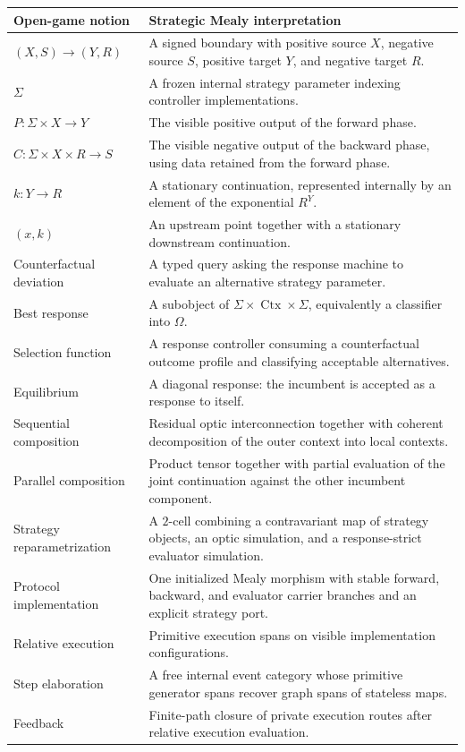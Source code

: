 \begin{center}
\begin{tabular}{p{}|p{}}
\textbf{Open-game notion}
&
\textbf{Strategic Mealy interpretation}
\\
\hline
\((X,S)\to(Y,R)\)
&
A signed boundary with positive source \(X\), negative source \(S\), positive target \(Y\), and
negative target \(R\).
\\[1mm]
\(\Sigma\)
&
A frozen internal strategy parameter indexing controller implementations.
\\[1mm]
\(P:\Sigma\times X\to Y\)
&
The visible positive output of the forward phase.
\\[1mm]
\(C:\Sigma\times X\times R\to S\)
&
The visible negative output of the backward phase, using data retained from the forward phase.
\\[1mm]
\(k:Y\to R\)
&
A stationary continuation, represented internally by an element of the exponential \(R^Y\).
\\[1mm]
\((x,k)\)
&
An upstream point together with a stationary downstream continuation.
\\[1mm]
Counterfactual deviation
&
A typed query asking the response machine to evaluate an alternative strategy parameter.
\\[1mm]
Best response
&
A subobject of
\(\Sigma\times\operatorname{Ctx}\times\Sigma\), equivalently a classifier into \(\Omega\).
\\[1mm]
Selection function
&
A response controller consuming a counterfactual outcome profile and classifying acceptable
alternatives.
\\[1mm]
Equilibrium
&
A diagonal response: the incumbent is accepted as a response to itself.
\\[1mm]
Sequential composition
&
Residual optic interconnection together with coherent decomposition of the outer context into local
contexts.
\\[1mm]
Parallel composition
&
Product tensor together with partial evaluation of the joint continuation against the other
incumbent component.
\\[1mm]
Strategy reparametrization
&
A \(2\)-cell combining a contravariant map of strategy objects, an optic simulation, and a
response-strict evaluator simulation.
\\[1mm]
Protocol implementation
&
One initialized Mealy morphism with stable forward, backward, and evaluator carrier branches and an
explicit strategy port.
\\[1mm]
Relative execution
&
Primitive execution spans on visible implementation configurations.
\\[1mm]
Step elaboration
&
A free internal event category whose primitive generator spans recover graph spans of stateless
maps.
\\[1mm]
Feedback
&
Finite-path closure of private execution routes after relative execution evaluation.
\end{tabular}
\end{center}

